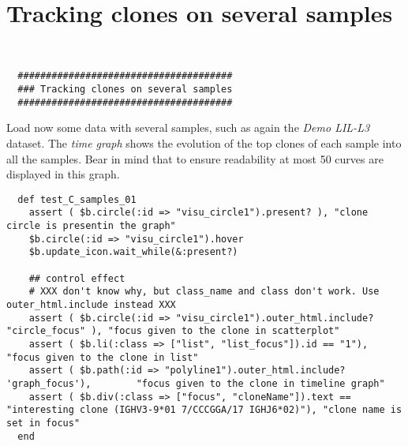 

\section{Tracking clones on several samples}

\label{sec:tracking}
\begin{verbatim}


  ######################################
  ### Tracking clones on several samples
  ######################################

\end{verbatim}

Load now some data with several samples, such as again the \textit{Demo LIL-L3} dataset.
The \textit{time graph} shows the evolution of the top clones of each sample into all the samples.
Bear in mind that to ensure readability at most 50 curves are displayed in this graph.

\begin{verbatim}
  def test_C_samples_01
    assert ( $b.circle(:id => "visu_circle1").present? ), "clone circle is presentin the graph"
    $b.circle(:id => "visu_circle1").hover
    $b.update_icon.wait_while(&:present?)

    ## control effect
    # XXX don't know why, but class_name and class don't work. Use outer_html.include instead XXX
    assert ( $b.circle(:id => "visu_circle1").outer_html.include? "circle_focus" ), "focus given to the clone in scatterplot"
    assert ( $b.li(:class => ["list", "list_focus"]).id == "1"),                    "focus given to the clone in list"
    assert ( $b.path(:id => "polyline1").outer_html.include? 'graph_focus'),        "focus given to the clone in timeline graph"
    assert ( $b.div(:class => ["focus", "cloneName"]).text == "interesting clone (IGHV3-9*01 7/CCCGGA/17 IGHJ6*02)"), "clone name is set in focus"
  end
\end{verbatim}

